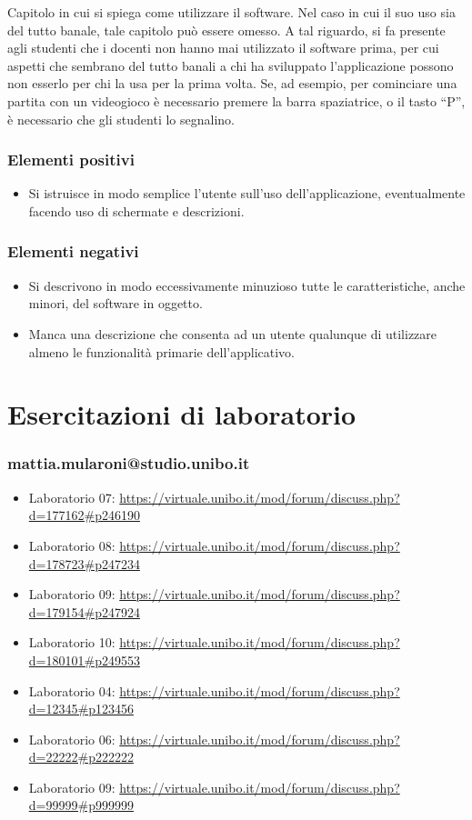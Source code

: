 \documentclass[a4paper,12pt]{report}
\begin{document}
Capitolo in cui si spiega come utilizzare il software. Nel caso in cui il suo uso sia del tutto
banale, tale capitolo può essere omesso.
%
A tal riguardo, si fa presente agli studenti che i docenti non hanno mai utilizzato il software
prima, per cui aspetti che sembrano del tutto banali a chi ha sviluppato l'applicazione possono non
esserlo per chi la usa per la prima volta.
%
Se, ad esempio, per cominciare una partita con un videogioco è necessario premere la barra
spaziatrice, o il tasto ``P'', è necessario che gli studenti lo segnalino.

\subsection*{Elementi positivi}

\begin{itemize}
 \item Si istruisce in modo semplice l'utente sull'uso dell'applicazione, eventualmente facendo uso di schermate e descrizioni.
\end{itemize}

\subsection*{Elementi negativi}
\begin{itemize}
 \item Si descrivono in modo eccessivamente minuzioso tutte le caratteristiche, anche minori, del software in oggetto.
 \item Manca una descrizione che consenta ad un utente qualunque di utilizzare almeno le funzionalità primarie dell'applicativo.
\end{itemize}

\chapter{Esercitazioni di laboratorio}

\subsection{mattia.mularoni@studio.unibo.it}

\begin{itemize}
\item Laboratorio 07: \url{https://virtuale.unibo.it/mod/forum/discuss.php?d=177162#p246190}
 \item Laboratorio 08: \url{https://virtuale.unibo.it/mod/forum/discuss.php?d=178723#p247234}
 \item Laboratorio 09: \url{https://virtuale.unibo.it/mod/forum/discuss.php?d=179154#p247924}
 \item Laboratorio 10: \url{https://virtuale.unibo.it/mod/forum/discuss.php?d=180101#p249553}
 \item Laboratorio 04: \url{https://virtuale.unibo.it/mod/forum/discuss.php?d=12345#p123456}
 \item Laboratorio 06: \url{https://virtuale.unibo.it/mod/forum/discuss.php?d=22222#p222222}
 \item Laboratorio 09: \url{https://virtuale.unibo.it/mod/forum/discuss.php?d=99999#p999999}
\end{itemize}
\end{document}
